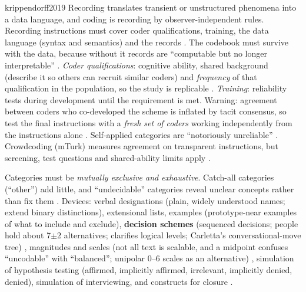 \begin{papercard}{krippendorff2019}
 Recording translates transient or unstructured phenomena into a data language, and coding is recording by observer-independent rules. Recording instructions must cover coder qualifications, training, the data language (syntax and semantics) and the records . The codebook must survive with the data, because without it records are ``computable but no longer interpretable'' . \emph{Coder qualifications}: cognitive ability, shared background (describe it so others can recruit similar coders) and \emph{frequency} of that qualification in the population, so the study is replicable . \emph{Training}: reliability tests during development until the requirement is met. Warning: agreement between coders who co-developed the scheme is inflated by tacit consensus, so test the final instructions with a \emph{fresh set of coders} working independently from the instructions alone . Self-applied categories are ``notoriously unreliable'' . Crowdcoding (mTurk) measures agreement on transparent instructions, but screening, test questions and shared-ability limits apply .

 Categories must be \emph{mutually exclusive and exhaustive}. Catch-all categories (``other'') add little, and ``undecidable'' categories reveal unclear concepts rather than fix them . Devices: verbal designations (plain, widely understood names; extend binary distinctions), extensional lists, examples (prototype-near examples of what to include and exclude), \textbf{decision schemes} (sequenced decisions; people hold about 7$\pm$2 alternatives; clarifies logical levels; Carletta's conversational-move tree) , magnitudes and scales (not all text is scalable, and a midpoint confuses ``uncodable'' with ``balanced''; unipolar 0--6 scales as an alternative) , simulation of hypothesis testing (affirmed, implicitly affirmed, irrelevant, implicitly denied, denied), simulation of interviewing, and constructs for closure .


\end{papercard}
